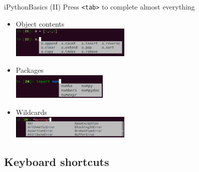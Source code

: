 \documentclass[10pt,compress]{beamer} %
\begin{document}
\begin{frame}{iPython}{Basics (II)}
    Press \texttt{<tab>} to complete almost everything
    \begin{itemize}
        \item Object contents\\
	\includegraphics[width=0.45\textwidth]{figs/tab.png} 
        \item Packages\\
	\includegraphics[width=0.36\textwidth]{figs/tab2.png}	
        \item Wildcards\\
	\includegraphics[width=0.45\textwidth]{figs/tab3.png}	
    \end{itemize}
\end{frame}

\subsection{Keyboard shortcuts}
\end{document}
